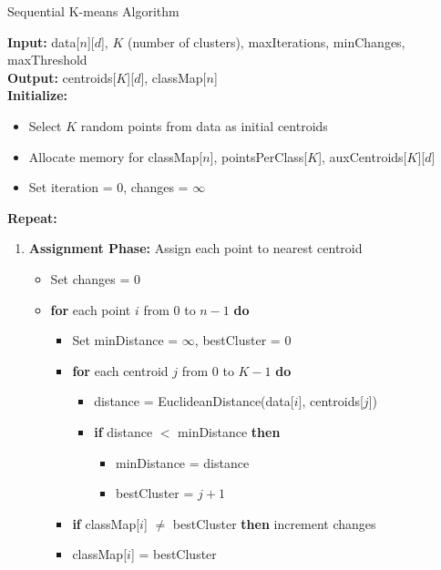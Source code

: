 \documentclass[12pt,a4paper]{article}
\begin{document}
\begin{algorithm}[H]
\caption{Sequential K-means Algorithm}
\label{alg:kmeans_sequential}
\begin{flushleft}
\textbf{Input:} data[$n$][$d$], $K$ (number of clusters), maxIterations, minChanges, maxThreshold\\
\textbf{Output:} centroids[$K$][$d$], classMap[$n$]\\

\textbf{Initialize:}
\begin{itemize}
    \item Select $K$ random points from data as initial centroids
    \item Allocate memory for classMap[$n$], pointsPerClass[$K$], auxCentroids[$K$][$d$]
    \item Set iteration = 0, changes = $\infty$
\end{itemize}

\textbf{Repeat:}
\begin{enumerate}
    \item \textbf{Assignment Phase:} Assign each point to nearest centroid
    \begin{itemize}
        \item Set changes = 0
        \item \textbf{for} each point $i$ from 0 to $n-1$ \textbf{do}
        \begin{itemize}
            \item Set minDistance = $\infty$, bestCluster = 0
            \item \textbf{for} each centroid $j$ from 0 to $K-1$ \textbf{do}
            \begin{itemize}
                \item distance = EuclideanDistance(data[$i$], centroids[$j$])
                \item \textbf{if} distance $<$ minDistance \textbf{then}
                \begin{itemize}
                    \item minDistance = distance
                    \item bestCluster = $j + 1$
                \end{itemize}
            \end{itemize}
            \item \textbf{if} classMap[$i$] $\neq$ bestCluster \textbf{then} increment changes
            \item classMap[$i$] = bestCluster
        \end{itemize}
    \end{itemize}


\end{enumerate}
\end{flushleft}
\end{algorithm}
\end{document}

